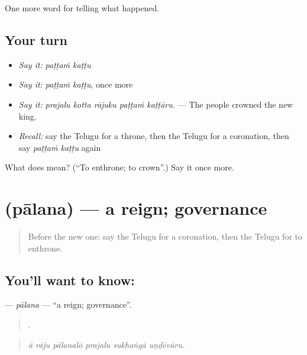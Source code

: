 \begin{grammarlens}[title={What you've built}]
One more word for telling what happened.
\end{grammarlens}

\subsection*{Your turn}
\begin{itemize}
\raggedright
  \item \emph{Say it:} \emph{paṭṭaṁ kaṭṭu}
  \item \emph{Say it:} \emph{paṭṭaṁ kaṭṭu}, once more
  \item \emph{Say it:} \emph{prajalu kotta rājuku paṭṭaṁ kaṭṭāru.} — The people crowned the new king.
  \item \emph{Recall:} say the Telugu for a throne, then the Telugu for a coronation, then say \emph{paṭṭaṁ kaṭṭu} again
\end{itemize}

\begin{tcolorbox}[breakable,colback=teal!4,colframe=teal!35!black,title={Before you move on}]
What does   mean? (\textquotedblleft{}To enthrone; to crown\textquotedblright{}.) Say it once more.
\end{tcolorbox}
\section[\texorpdfstring{\te{పాలన} (pālana)}{పాలన (pālana)}]{ (pālana) — a reign; governance}

\label{lesson:TE-C335-palana}



\begin{quote}
Before the new one: say the Telugu for a coronation, then the Telugu for to enthrone.
\end{quote}

\subsection*{You'll want to know: }
\textbf{} — \emph{pālana} — \textquotedblleft{}a reign; governance\textquotedblright{}.

\begin{quote}
     .
\end{quote}

\begin{quote}
\emph{ā rāju pālanalō prajalu sukhaṅgā uṇḍēvāru.}
\end{quote}


